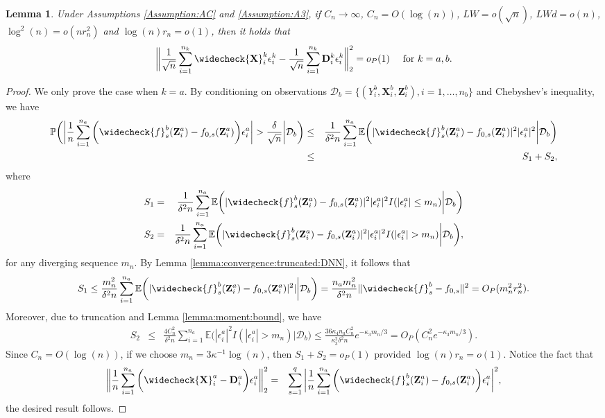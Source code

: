 \documentclass[11pt, preprint]{imsart}
\numberwithin{equation}{section}
\def \mcD{\mathcal{D}}
\def \bfD{\mathbf{D}}
\def \bfX{\mathbf{X}}
\def \bfZ{\mathbf{Z}}
\def \bfD{\mathbf{D}}
\def \ev{\mathbb{E}}
\def \pr{\mathbb{P}}
\theoremstyle{plain}
\newtheorem{lemma}{\indent Lemma}
\theoremstyle{definition}
\begin{document}
\begin{lemma}\label{lemma:split:sample:difference:rate:3}
Under Assumptions \ref{Assumption:AC} and \ref{Assumption:A3}, if $C_n \to \infty$, $C_n=O(\log(n))$, $LW=o(\sqrt{n})$, $LWd=o(n)$, $\log^2(n)=o(nr_n^2)$ and $\log(n)r_n=o(1)$, then it holds that 
$$\bigg\|\frac{1}{\sqrt{n}}\sum_{i=1}^{n_k}\widecheck{\bfX}_i^k\epsilon_i^k-\frac{1}{\sqrt{n}}\sum_{i=1}^{n_k}\bfD_i^k\epsilon_i^k\bigg\|_2^2=o_P(1) \quad \textrm{ for } k=a, b.$$
\end{lemma}
\begin{proof}
We only prove the case when $k=a$. By conditioning on observations $\mcD_b=\{(Y_i^b, \bfX_i^b, \bfZ_i^b), i=1,\ldots, n_b\}$ and Chebyshev's inequality, we have
\begin{eqnarray*}
	\pr\bigg(\bigg|\frac{1}{n}\sum_{i=1}^{n_a}\bigg(\widecheck{f}_s^b(\bfZ_i^a)-f_{0,s}(\bfZ_i^a)\bigg)\epsilon_i^a\bigg|>\frac{\delta}{\sqrt{n}} \bigg| \mcD_b\bigg)&\leq& \frac{1}{\delta^2n}\sum_{i=1}^{n_a}\ev\bigg(|\widecheck{f}_s^b(\bfZ^a_i)-f_{0,s}(\bfZ^a_i)|^2|\epsilon_i^a|^2\bigg| \mcD_b\bigg)\nonumber\\
	&\leq& S_1+S_2,\nonumber
\end{eqnarray*}
where 
\begin{eqnarray}
	S_1&=&\frac{1}{\delta^2n} \sum_{i=1}^{n_a}\ev\bigg(|\widecheck{f}_s^b(\bfZ_i^a)-f_{0,s}(\bfZ_i^a)|^2|\epsilon_i^a|^2I(|\epsilon_i^a|\leq m_n)\bigg| \mcD_b\bigg)\nonumber\\
	S_2&=&\frac{1}{\delta^2n}\sum_{i=1}^{n_a} \ev\bigg(|\widecheck{f}_s^b(\bfZ_i^a)-f_{0,s}(\bfZ_i^a)|^2|\epsilon_i^a|^2I(|\epsilon_i^a|> m_n)\bigg| \mcD_b\bigg)\nonumber,
\end{eqnarray}
for any diverging sequence $m_n$. By Lemma \ref{lemma:convergence:truncated:DNN}, it follows that 
\begin{eqnarray}
	S_1\leq \frac{m_n^2}{\delta^2n}\sum_{i=1}^{n_a}\ev\bigg(|\widecheck{f}_s^b(\bfZ_i^a)-f_{0,s}(\bfZ_i^a)|^2|\bigg| \mcD_b\bigg)= \frac{n_am_n^2}{\delta^2n}\|\widecheck{f}_s^b-f_{0,s}\|^2=O_P(m_n^2r_n^2).\nonumber
\end{eqnarray}
Moreover, due to truncation and Lemma \ref{lemma:moment:bound}, we have
\begin{eqnarray}
	S_2&\leq&\frac{4C_n^2}{\delta^2n}\sum_{i=1}^{n_a} \ev\bigg(|\epsilon_i^a|^2I(|\epsilon_i^a|> m_n)\bigg| \mcD_b\bigg)\leq \frac{36\kappa_4n_aC_n^2}{\kappa_3^2\delta^2n}e^{-\kappa_3m_n/3}=O_P(C_n^2e^{-\kappa_3m_n/3}).\nonumber
\end{eqnarray}
Since $C_n=O(\log(n))$, if we choose $m_n=3\kappa^{-1}\log(n)$, then $S_1+S_2=o_P(1)$ provided $\log(n)r_n=o(1)$. 
Notice the fact that
\begin{eqnarray*}
	\bigg\|\frac{1}{n}\sum_{i=1}^{n_a}\bigg(\widecheck{\bfX}_i^a-\bfD_i^a\bigg)\epsilon_i^a\bigg\|_2^2&=&\sum_{s=1}^q \bigg|\frac{1}{n}\sum_{i=1}^{n_a}\bigg(\widecheck{f}_s^b(\bfZ_i^a)-f_{0,s}(\bfZ_i^a)\bigg)\epsilon_i^a\bigg|^2,
\end{eqnarray*}
the desired result follows.
\end{proof}
\end{document}
